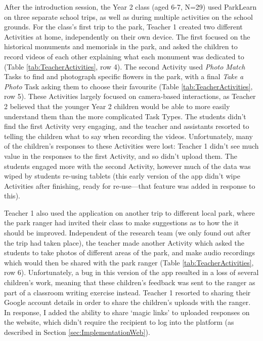 After the introduction session, the Year 2 class (aged 6-7, N=29) used ParkLearn on three separate school trips, as well as during multiple activities on the school grounds. For the class's first trip to the park, Teacher 1 created two different Activities at home, independently on their own device. The first focused on the historical monuments and memorials in the park, and asked the children to record videos of each other explaining what each monument was dedicated to (Table \ref{tab:TeacherActivities}, row 4). The second Activity used \textit{Photo Match} Tasks to find and photograph specific flowers in the park, with a final \textit{Take a Photo} Task asking them to choose their favourite (Table \ref{tab:TeacherActivities}, row 5). These Activities largely focused on camera-based interactions, as Teacher 2 believed that the younger Year 2 children would be able to more easily understand them than the more complicated Task Types. The students didn't find the first Activity very engaging, and the teacher and assistants resorted to telling the children what to say when recording the videos. Unfortunately, many of the children's responses to these Activities were lost: Teacher 1 didn't see much value in the responses to the first Activity, and so didn't upload them. The students engaged more with the second Activity, however much of the data was wiped by students re-using tablets (this early version of the app didn't wipe Activities after finishing, ready for re-use---that feature was added in response to this).   

Teacher 1 also used the application on another trip to different local park, where the park ranger had invited their class to make suggestions as to how the it should be improved. Independent of the research team (we only found out after the trip had taken place), the teacher made another Activity which asked the students to take photos of different areas of the park, and make audio recordings which would then be shared with the park ranger (Table \ref{tab:TeacherActivities}, row 6). Unfortunately, a bug in this version of the app resulted in a loss of several children’s work, meaning that these children’s feedback was sent to the ranger as part of a classroom writing exercise instead. Teacher 1 resorted to sharing their Google account details in order to share the children's uploads with the ranger. In response, I added the ability to share `magic links' to uploaded responses on the website, which didn't require the recipient to log into the platform (as described in Section \ref{sec:ImplementationWeb}).

